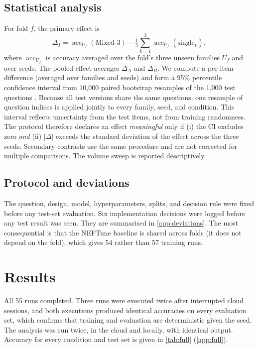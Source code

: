 \documentclass[11pt]{article}
\begin{document}
\subsection{Statistical analysis}

For fold $f$, the primary effect is
\begin{equation}
\Delta_f = \operatorname{acc}_{U_f}(\text{Mixed-3}) - \tfrac{1}{3}\textstyle\sum_{k=1}^{3} \operatorname{acc}_{U_f}(\text{single}_k),
\end{equation}
where $\operatorname{acc}_{U_f}$ is accuracy averaged over the fold's three unseen families $U_f$ and over seeds. The pooled effect averages $\Delta_A$ and $\Delta_B$. We compute a per-item difference (averaged over families and seeds) and form a 95\% percentile confidence interval from 10{,}000 paired bootstrap resamples of the 1{,}000 test questions \citep{efron1993bootstrap}. Because all test versions share the same questions, one resample of question indices is applied jointly to every family, seed, and condition. This interval reflects uncertainty from the test items, not from training randomness. The protocol therefore declares an effect \emph{meaningful} only if (i) the CI excludes zero \emph{and} (ii) $|\Delta|$ exceeds the standard deviation of the effect across the three seeds. Secondary contrasts use the same procedure and are not corrected for multiple comparisons. The volume sweep is reported descriptively.

\subsection{Protocol and deviations}

The question, design, model, hyperparameters, splits, and decision rule were fixed before any test-set evaluation. Six implementation decisions were logged before any test result was seen. They are summarised in \cref{app:deviations}. The most consequential is that the NEFTune baseline is shared across folds (it does not depend on the fold), which gives 54 rather than 57 training runs.

\section{Results}
\label{sec:results}

All 55 runs completed. Three runs were executed twice after interrupted cloud sessions, and both executions produced identical accuracies on every evaluation set, which confirms that training and evaluation are deterministic given the seed. The analysis was run twice, in the cloud and locally, with identical output. Accuracy for every condition and test set is given in \cref{tab:full} (\cref{app:full}).
\end{document}

